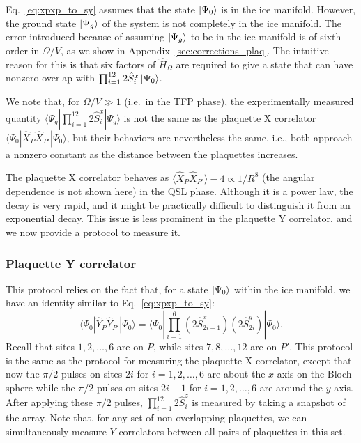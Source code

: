 \documentclass[twocolumn,superscriptaddress,amsmath,amssymb,aps,prx,nofootinbib]{revtex4-2}
\begin{document}
 
Eq.~\eqref{eq:xpxp_to_sy} assumes that the state $\ket{\Psi_0}$ is in the ice manifold. However, the ground state $\ket{\Psi_g}$ of the system  is not completely in the ice manifold.  The error introduced because of assuming $\ket{\Psi_g}$ to be in the ice manifold is of sixth order in $\Omega/V$, as we show in Appendix~\ref{sec:corrections_plaq}. The intuitive reason for this is that six factors of $\hat{H}_\Omega$ are required to give a state that can have nonzero overlap with $\prod_{i=1}^{12} 2 \hat{S}_i^x \ket{\Psi_0}$.

We note that, for $\Omega/V \gg 1$ (i.e.\ in the TFP phase), the experimentally measured quantity $\langle \Psi_g | \prod_{i=1}^{12} 2 \hat{S}_i^x | \Psi_g \rangle$ is not the same as the plaquette X correlator $\langle \Psi_0 | \hat{X}_P \hat{X}_{P'} | \Psi_0 \rangle$, but their behaviors are nevertheless the same, i.e., both approach a nonzero constant as the distance between the plaquettes increases.


The plaquette X correlator behaves as $\langle \hat{X}_P \hat{X}_{P'} \rangle  - 4 \propto 1/R^8$ (the angular dependence is not shown here) in the QSL phase. Although it is a power law, the decay is very rapid, and it might be practically difficult to distinguish it from an exponential decay. 
This issue is less prominent in the plaquette Y correlator, and we now provide a protocol to measure it.


\subsubsection{Plaquette Y correlator}\label{sec:y_plaq_corr}


This protocol relies on the fact that, for a state $\ket{\Psi_0}$ within the ice manifold, we have an identity similar to Eq.~\eqref{eq:xpxp_to_sy}:
\begin{equation} \label{eq:yp_to_xy}
  \langle \Psi_0| \hat{Y}_P \hat{Y}_{P'} |\Psi_0 \rangle  = \langle \Psi_0| \prod_{i=1}^6 (2\hat{S}^x_{2i-1}) (2\hat{S}^y_{2i} )| \Psi_0\rangle.
\end{equation}
Recall that sites $1,2,\ldots,6$ are on $P$, while sites $7,8,\ldots, 12$ are on $P'$.
This protocol is the same as the protocol for measuring the plaquette X correlator, except that now the $\pi/2$ pulses on sites  $2i$ for $i= 1,2,\ldots,6$ are about the $x$-axis on the Bloch sphere while the $\pi/2$ pulses on  sites $2i-1$ for $i=1,2,\ldots,6$ are around the $y$-axis. After applying these $\pi/2$ pulses, $\prod_{i=1}^{12} 2 \hat{S}_i^z$ is measured by taking a snapshot of the array. Note that, for any set of non-overlapping plaquettes, we can simultaneously measure $Y$ correlators between all pairs of plaquettes in this set. 
 
\end{document}

